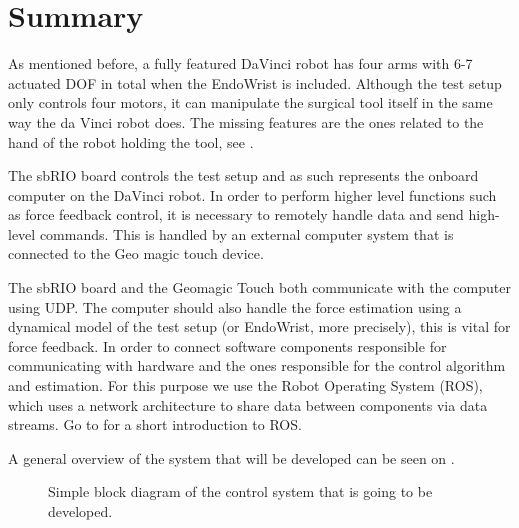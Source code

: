 \section{Summary}
As mentioned before, a fully featured DaVinci robot has four arms with 6-7 actuated \gls{DOF} in total when the EndoWrist is included.
Although the test setup only controls four motors, it can manipulate the surgical tool itself in the same way the da Vinci robot does. The missing features are the ones related to the hand of the robot holding the tool, see .

The sbRIO board controls the test setup and as such represents the onboard computer on the DaVinci robot.
In order to perform higher level functions such as force feedback control, it is necessary to remotely handle data and send high-level commands.
This is handled by an external computer system that is connected to the Geo magic touch device.

The sbRIO board and the Geomagic Touch both communicate with the computer using UDP. The computer should also handle the force estimation using a dynamical model of the test setup (or EndoWrist, more precisely), this is vital for force feedback.
In order to connect software components responsible for communicating with hardware and the ones responsible for the control algorithm and estimation.
For this purpose we use the Robot Operating System (ROS), which uses a network architecture to share data between components via data streams. Go to  for a short introduction to ROS.

A general overview of the system that will be developed can be seen on .

\begin{figure}[H]

\caption{Simple block diagram of the control system that is going to be developed.}
\label{sec:summering_model}
\end{figure}


